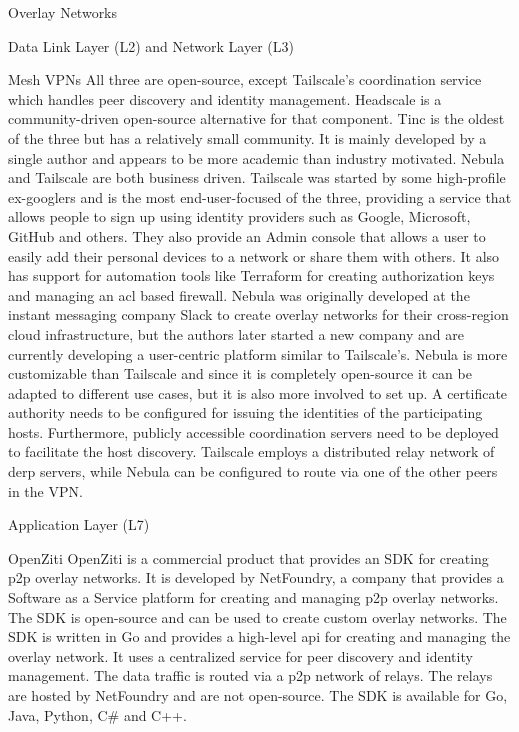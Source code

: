 \begin{block}{Overlay Networks}
\begin{block}{Data Link Layer (L2) and Network Layer (L3)}
\begin{block}{Mesh VPNs}
All three are open-source, except Tailscale's coordination service which handles peer discovery and identity management. Headscale \autocite{fontJuanfontHeadscale2022} is a community-driven open-source alternative for that component. Tinc is the oldest of the three but has a relatively small community. It is mainly developed by a single author and appears to be more academic than industry motivated.
Nebula and Tailscale are both business driven. Tailscale was started by some high-profile ex-googlers and is the most end-user-focused of the three, providing a service that allows people to sign up using identity providers such as Google, Microsoft, GitHub and others. They also provide an Admin console that allows a user to easily add their personal devices to a network or share them with others. It also has support for automation tools like Terraform for creating authorization keys and managing an \gls{acl} based firewall.
Nebula was originally developed at the instant messaging company Slack to create overlay networks for their cross-region cloud infrastructure, but the authors later started a new company and are currently developing a user-centric platform similar to Tailscale's. Nebula is more customizable than Tailscale and since it is completely open-source it can be adapted to different use cases, but it is also more involved to set up. A certificate authority needs to be configured for issuing the identities of the participating hosts. Furthermore, publicly accessible coordination servers need to be deployed to facilitate the host discovery.
Tailscale employs a distributed relay network of \gls{derp} servers, while Nebula can be configured to route via one of the other peers in the VPN.
\end{block}
\end{block}

\begin{block}{Application Layer (L7)}
\label{thesis__022-overlays.md__application-layer-l7}
\begin{block}{OpenZiti}
\label{thesis__022-overlays.md__openziti}
OpenZiti is a commercial product that provides an SDK for creating \gls{p2p} overlay networks. It is developed by NetFoundry, a company that provides a Software as a Service platform for creating and managing \gls{p2p} overlay networks. The SDK is open-source and can be used to create custom overlay networks. The SDK is written in Go and provides a high-level \gls{api} for creating and managing the overlay network. It uses a centralized service for peer discovery and identity management. The data traffic is routed via a \gls{p2p} network of relays. The relays are hosted by NetFoundry and are not open-source. The SDK is available for Go, Java, Python, C\# and C++.


\end{block}
\end{block}
\end{block}

